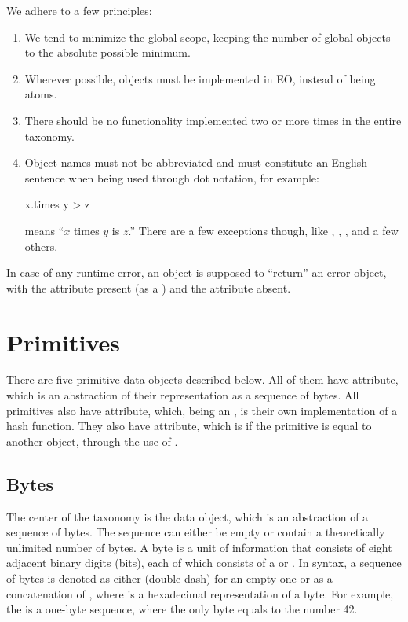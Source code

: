 \documentclass[sigplan,11pt,nonacm]{acmart}
\newcommand\aff[1]{\ff{\textcolor{gray}{$\star$}#1}}
\newcommand\deff[1]{\ff{\textcolor{blue!50!black}{\textbf{#1}}}}
\newcommand\adeff[1]{\aff{\textcolor{blue!50!black}{\textbf{#1}}}}
\newcommand\eohex[1]{\ff{#1}}
\begin{document}
We adhere to a few principles:
\begin{enumerate}
  \item We tend to minimize the global scope, keeping the number of global objects to the absolute possible minimum.
  \item Wherever possible, objects must be implemented in EO, instead of being atoms.
  \item There should be no functionality implemented two or more times in the entire taxonomy.
  \item Object names must not be abbreviated and must constitute an English sentence when being used through dot notation, for example:
\begin{ffcode}
x.times y > z
\end{ffcode}
means ``\(x\) times \(y\) is \(z\).''
There are a few exceptions though, like , , , and a few others.
\end{enumerate}

In case of any runtime error, an object is supposed to ``return'' an error
object, with the  attribute present (as a ) and
the  attribute absent.

\section{Primitives}\label{sec:primitives}

There are five primitive data objects described below. All of them have
\adeff{as-bytes} attribute, which is an abstraction of their representation as a
sequence of bytes. All primitives also have \deff{as-hash} attribute, which,
being an , is their own implementation of a hash function. They also
have \deff{eq} attribute, which is  if the primitive is equal to
another object, through the use of .

\subsection{Bytes}

The center of the taxonomy is the \deff{bytes} data object, which is an abstraction
of a sequence of bytes. The sequence can either be empty or contain a
theoretically unlimited number of bytes. A byte is a unit of information that
consists of eight adjacent binary digits (bits), each of which consists of a 
or . In \eolang{} syntax, a sequence of bytes is denoted as either \eohex{--}
(double dash) for an empty one or as a concatenation of \eohex{xx-}, where
 is a hexadecimal representation of a byte. For example, the  is
a one-byte sequence, where the only byte equals to the number 42.
\end{document}
